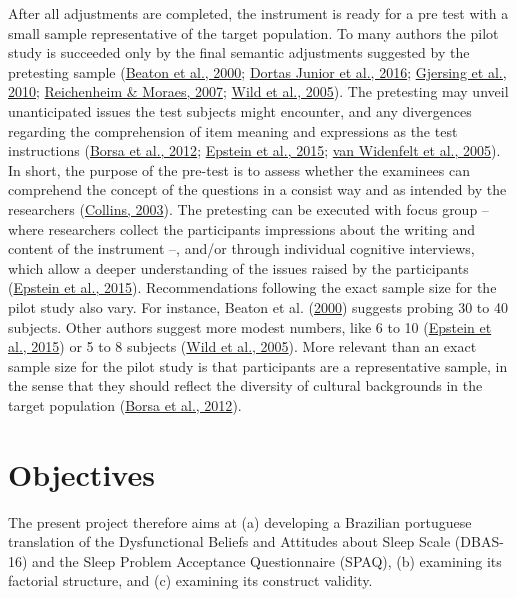 \documentclass[
  ,doc,11pt, twoside,floatsintext]{apa6}
\begin{document}
After all adjustments are completed, the instrument is ready for a pre test with a small sample representative of the target population. To many authors the pilot study is succeeded only by the final semantic adjustments suggested by the pretesting sample (\protect\hyperlink{ref-beaton2000}{Beaton et al., 2000}; \protect\hyperlink{ref-dortasjunior2016}{Dortas Junior et al., 2016}; \protect\hyperlink{ref-gjersing2010}{Gjersing et al., 2010}; \protect\hyperlink{ref-reichenheim2007}{Reichenheim \& Moraes, 2007}; \protect\hyperlink{ref-wild2005}{Wild et al., 2005}). The pretesting may unveil unanticipated issues the test subjects might encounter, and any divergences regarding the comprehension of item meaning and expressions as the test instructions (\protect\hyperlink{ref-borsaAdaptacaoValidacaoInstrumentos2012}{Borsa et al., 2012}; \protect\hyperlink{ref-epstein2015}{Epstein et al., 2015}; \protect\hyperlink{ref-vanwidenfelt2005}{van Widenfelt et al., 2005}). In short, the purpose of the pre-test is to assess whether the examinees can comprehend the concept of the questions in a consist way and as intended by the researchers (\protect\hyperlink{ref-collins2003}{Collins, 2003}). The pretesting can be executed with focus group -- where researchers collect the participants impressions about the writing and content of the instrument --, and/or through individual cognitive interviews, which allow a deeper understanding of the issues raised by the participants (\protect\hyperlink{ref-epstein2015}{Epstein et al., 2015}). Recommendations following the exact sample size for the pilot study also vary. For instance, Beaton et al. (\protect\hyperlink{ref-beaton2000}{2000}) suggests probing 30 to 40 subjects. Other authors suggest more modest numbers, like 6 to 10 (\protect\hyperlink{ref-epstein2015}{Epstein et al., 2015}) or 5 to 8 subjects (\protect\hyperlink{ref-wild2005}{Wild et al., 2005}). More relevant than an exact sample size for the pilot study is that participants are a representative sample, in the sense that they should reflect the diversity of cultural backgrounds in the target population (\protect\hyperlink{ref-borsaAdaptacaoValidacaoInstrumentos2012}{Borsa et al., 2012}).

\hypertarget{objectives}{%
\section{Objectives}\label{objectives}}

The present project therefore aims at (a) developing a Brazilian portuguese translation of the Dysfunctional Beliefs and Attitudes about Sleep Scale (DBAS-16) and the Sleep Problem Acceptance Questionnaire (SPAQ), (b) examining its factorial structure, and (c) examining its construct validity.
\end{document}

